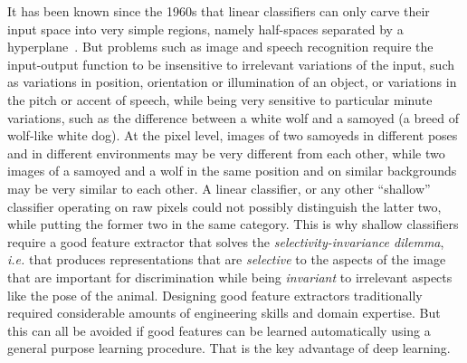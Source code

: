\documentclass[10pts]{article}
\begin{document}
It has been known since the 1960s that linear classifiers can only
carve their input space into very simple regions, namely
half-spaces separated by a hyperplane~\citep{Duda-Hart}.  But problems
such as image and speech recognition require the input-output function
to be insensitive to irrelevant variations of the input, such as
variations in position, orientation or illumination of an object, or
variations in the pitch or accent of speech, while being very sensitive to
particular minute variations, such as the difference between a white
wolf and a samoyed (a breed of wolf-like white dog).  At the pixel
level, images of two samoyeds in different poses and in different
environments may be very different from each other, while two images
of a samoyed and a wolf in the same position and on similar
backgrounds may be very similar to each other. A linear classifier,
or any other ``shallow'' classifier operating on raw pixels could not
possibly distinguish the latter two, while putting the former two in
the same category. This is why shallow classifiers require a good
feature extractor that solves the {\em selectivity-invariance dilemma},
{\it i.e.} that produces representations that are {\em selective} to the
aspects of the image that are important for discrimination while being {\em invariant} to 
irrelevant aspects like the pose of the animal.
%
Designing good feature extractors traditionally required considerable amounts
of engineering skills and domain expertise. But this can all be avoided if
good features can be learned automatically using a general purpose
learning procedure.  That is the key advantage of deep
learning.
\end{document}
